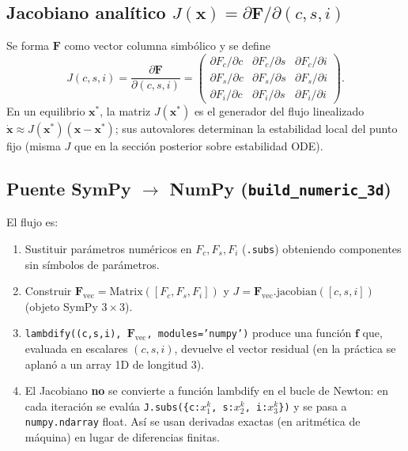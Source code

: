 \documentclass[11pt,a4paper]{article}
\begin{document}
\subsection[Jacobiano analítico]{Jacobiano analítico $J(\mathbf{x})=\partial \mathbf{F}/\partial(c,s,i)$}

Se forma $\mathbf{F}$ como vector columna simbólico y se define
\[
J(c,s,i) = \frac{\partial \mathbf{F}}{\partial(c,s,i)}
= \begin{pmatrix}
\partial F_c/\partial c & \partial F_c/\partial s & \partial F_c/\partial i \\
\partial F_s/\partial c & \partial F_s/\partial s & \partial F_s/\partial i \\
\partial F_i/\partial c & \partial F_i/\partial s & \partial F_i/\partial i
\end{pmatrix}.
\]
En un equilibrio $\mathbf{x}^\ast$, la matriz $J(\mathbf{x}^\ast)$ es el generador del flujo linealizado $\dot{\mathbf{x}}\approx J(\mathbf{x}^\ast)(\mathbf{x}-\mathbf{x}^\ast)$; sus autovalores determinan la estabilidad local del punto fijo (misma $J$ que en la sección posterior sobre estabilidad ODE).

\subsection[Puente SymPy a NumPy]{Puente SymPy $\rightarrow$ NumPy (\texttt{build\_numeric\_3d})}

El flujo es:
\begin{enumerate}[leftmargin=*]
  \item Sustituir parámetros numéricos en $F_c,F_s,F_i$ (\texttt{.subs}) obteniendo componentes sin símbolos de parámetros.
  \item Construir $\mathbf{F}_{\mathrm{vec}}=\mathrm{Matrix}([F_c,F_s,F_i])$ y $J=\mathbf{F}_{\mathrm{vec}}.\mathrm{jacobian}([c,s,i])$ (objeto SymPy $3\times 3$).
  \item \texttt{lambdify((c,s,i), $\mathbf{F}_{\mathrm{vec}}$, modules='numpy')} produce una función $\mathbf{f}$ que, evaluada en escalares $(c,s,i)$, devuelve el vector residual (en la práctica se aplanó a un array 1D de longitud 3).
  \item El Jacobiano \textbf{no} se convierte a función lambdify en el bucle de Newton: en cada iteración se evalúa \texttt{J.subs(\{c:$x^k_1$, s:$x^k_2$, i:$x^k_3$\})} y se pasa a \texttt{numpy.ndarray} float. Así se usan derivadas exactas (en aritmética de máquina) en lugar de diferencias finitas.
\end{enumerate}
\end{document}

